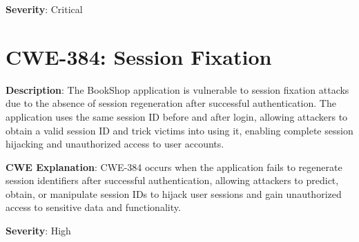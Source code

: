 \documentclass[]{UCD_CS_FYP_Report}
\begin{document}
\textbf{Severity}: Critical



\section{CWE-384: Session Fixation}

\textbf{Description}: The BookShop application is vulnerable to session fixation attacks due to the absence of session regeneration after successful authentication. The application uses the same session ID before and after login, allowing attackers to obtain a valid session ID and trick victims into using it, enabling complete session hijacking and unauthorized access to user accounts.

\textbf{CWE Explanation}: CWE-384 occurs when the application fails to regenerate session identifiers after successful authentication, allowing attackers to predict, obtain, or manipulate session IDs to hijack user sessions and gain unauthorized access to sensitive data and functionality.

\textbf{Severity}: High
\end{document}
